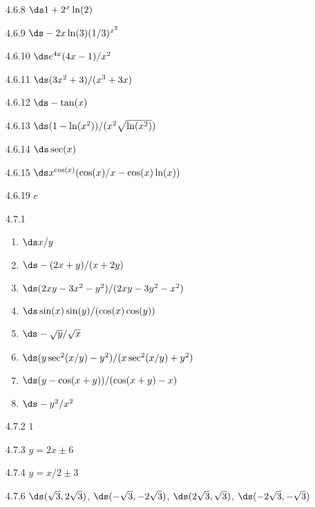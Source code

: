 \begin{Answer}{4.6.8}
	$\ds 1+2^x\ln(2)$
\end{Answer}
\begin{Answer}{4.6.9}
	$\ds -2x\ln(3)(1/3)^{x^2}$
\end{Answer}
\begin{Answer}{4.6.10}
	$\ds e^{4x}(4x-1)/x^2$
\end{Answer}
\begin{Answer}{4.6.11}
	$\ds (3x^2+3)/(x^3+3x)$
\end{Answer}
\begin{Answer}{4.6.12}
	$\ds -\tan(x)$
\end{Answer}
\begin{Answer}{4.6.13}
	$\ds (1-\ln(x^2))/(x^2\sqrt{\ln(x^2)})$
\end{Answer}
\begin{Answer}{4.6.14}
	$\ds \sec(x)$
\end{Answer}
\begin{Answer}{4.6.15}
	$\ds x^{\cos(x)}(\cos(x)/x-\cos(x)\ln(x))$
\end{Answer}
\begin{Answer}{4.6.19}
$e$
\end{Answer}
\begin{Answer}{4.7.1}
\begin{enumerate}
	\item	$\ds x/y$
	\item	$\ds -(2x+y)/(x+2y)$
	\item	$\ds (2xy-3x^2-y^2)/(2xy-3y^2-x^2)$
	\item	$\ds \sin(x)\sin(y)/(\cos(x)\cos(y))$
	\item	$\ds-\sqrt{y}/\sqrt{x}$
	\item	$\ds (y\sec^2(x/y)-y^2)/(x\sec^2(x/y)+y^2)$
	\item	$\ds (y-\cos(x+y))/(\cos(x+y)-x)$
	\item	$\ds -y^2/x^2$
\end{enumerate}
\end{Answer}
\begin{Answer}{4.7.2}
	$1$
\end{Answer}
\begin{Answer}{4.7.3}
	$y=2x\pm6$
\end{Answer}
\begin{Answer}{4.7.4}
	$y=x/2\pm3$
\end{Answer}
\begin{Answer}{4.7.6}
	$\ds (\sqrt3,2\sqrt3)$, $\ds (-\sqrt3,-2\sqrt3)$, $\ds (2\sqrt3,\sqrt3)$,
$\ds (-2\sqrt3,-\sqrt3)$
\end{Answer}
